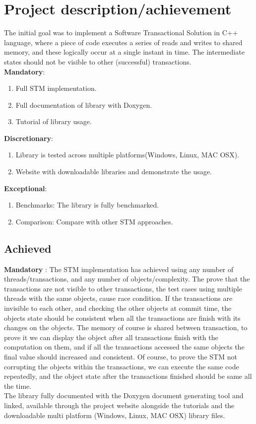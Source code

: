 \documentclass[12pt]{article}
\begin{document}
\section{Project description/achievement}
The initial goal was to implement a Software Transactional Solution in C++ language, where a piece of code executes a series of reads and writes to shared memory, and these logically occur at a single instant in time. The intermediate states should not be visible to other (successful) transactions.\\
\textbf{Mandatory}:
\begin{enumerate}
\item Full STM implementation. 
\item Full documentation of library with Doxygen.
\item Tutorial of library usage.
\end{enumerate}
\textbf{Discretionary}:
\begin{enumerate}
\item Library is tested across multiple platforms(Windows, Linux, MAC OSX). 
\item Website with downloadable libraries and demonstrate the usage.
\end{enumerate}
\textbf{Exceptional}:
\begin{enumerate}
\item Benchmarks: The library is fully benchmarked. 
\item Comparison: Compare with other STM approaches.
\end{enumerate}
\subsection{Achieved}
\textbf{Mandatory} : The STM implementation has achieved using any number of threads/transactions, and any number of objects/complexity. The prove that the transactions are not visible to other transactions, the test cases using multiple threads with the same objects, cause race condition. If the transactions are invisible to each other, and checking the other objects at commit time, the objects state should be consistent when all the transactions are finish with its changes on the objects. The memory of course is shared between transaction, to prove it we can display the object after all transactions finish with the computation on them, and if all the transactions accessed the same objects the final value should increased and consistent. Of course, to prove the STM not corrupting the objects within the transactions, we can execute the same code repeatedly, and the object state after the transactions finished should be same all the time.\\
The library fully documented with the Doxygen document generating tool and linked, available through the project website alongside the tutorials and the downloadable multi platform (Windows, Linux, MAC OSX) library files.
\end{document}
